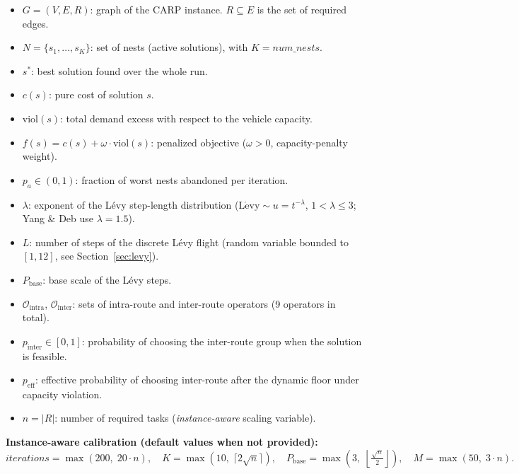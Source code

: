 \documentclass[12pt, a4paper]{article}
\begin{document}
\begin{itemize}
    \item $G = (V, E, R)$: graph of the CARP instance. $R \subseteq E$ is the
          set of required edges.
    \item $N = \{s_1, \ldots, s_{K}\}$: set of nests (active solutions),
          with $K = \mathit{num\_nests}$.
    \item $s^{*}$: best solution found over the whole run.
    \item $c(s)$: pure cost of solution $s$.
    \item $\mathrm{viol}(s)$: total demand excess with respect to the vehicle
          capacity.
    \item $f(s) = c(s) + \omega \cdot \mathrm{viol}(s)$: penalized objective
          ($\omega > 0$, capacity-penalty weight).
    \item $p_a \in (0,1)$: fraction of worst nests abandoned per iteration.
    \item $\lambda$: exponent of the L\'evy step-length distribution
          ($\mathrm{L\acute{e}vy} \sim u = t^{-\lambda}$, $1 < \lambda \leq 3$;
          Yang \& Deb use $\lambda = 1.5$).
    \item $L$: number of steps of the discrete L\'evy flight (random variable
          bounded to $[1, 12]$, see Section~\ref{sec:levy}).
    \item $P_{\mathrm{base}}$: base scale of the L\'evy steps.
    \item $\mathcal{O}_{\mathrm{intra}}$, $\mathcal{O}_{\mathrm{inter}}$:
          sets of intra-route and inter-route operators (9 operators in total).
    \item $p_{\mathrm{inter}} \in [0,1]$: probability of choosing the
          inter-route group when the solution is feasible.
    \item $p_{\mathrm{eff}}$: effective probability of choosing inter-route
          after the dynamic floor under capacity violation.
    \item $n = |R|$: number of required tasks (\emph{instance-aware} scaling
          variable).
\end{itemize}

\medskip
\noindent
\textbf{Instance-aware calibration (default values when not provided):}
\[
\mathit{iterations} = \max(200,\; 20 \cdot n), \quad
K = \max(10,\; \lceil 2\sqrt{n} \rceil), \quad
P_{\mathrm{base}} = \max\!\left(3,\; \left\lfloor\tfrac{\sqrt{n}}{2}\right\rfloor\right), \quad
M = \max(50,\; 3 \cdot n).
\]
\end{document}

